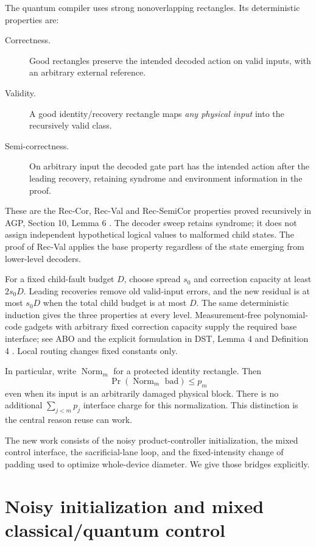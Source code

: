 \documentclass[11pt]{article}
\newcommand{\Norm}{\operatorname{Norm}}
\begin{document}
The quantum compiler uses strong nonoverlapping rectangles. Its
deterministic properties are:
\begin{description}
\item[Correctness.] Good rectangles preserve the intended decoded action
on valid inputs, with an arbitrary external reference.
\item[Validity.] A good identity/recovery rectangle maps \emph{any physical
input} into the recursively valid class.
\item[Semi-correctness.] On arbitrary input the decoded gate part has the
intended action after the leading recovery, retaining syndrome and
environment information in the proof.
\end{description}
These are the Rec-Cor, Rec-Val and Rec-SemiCor properties proved recursively
in AGP, Section 10, Lemma 6 \cite{AGP}. The decoder sweep retains syndrome;
it does not assign independent hypothetical logical values to malformed
child states. The proof of Rec-Val applies the base property regardless
of the state emerging from lower-level decoders.

For a fixed child-fault budget $D$, choose spread $s_0$ and correction
capacity at least $2s_0D$. Leading recoveries remove old valid-input errors,
and the new residual is at most $s_0D$ when the total child budget is at
most $D$. The same deterministic induction gives the three properties at
every level. Measurement-free polynomial-code gadgets with arbitrary
fixed correction capacity supply the required base interface; see
ABO \cite{ABO} and the explicit formulation in DST, Lemma 4 and
Definition 4 \cite{DST}. Local routing changes fixed constants only.

In particular, write $\Norm_m$ for a protected identity rectangle. Then
\[
 \Pr(\Norm_m\text{ bad})\leq p_m
\]
even when its input is an arbitrarily damaged physical block. There is
no additional $\sum_{j<m}p_j$ interface charge for this normalization.
This distinction is the central reason reuse can work.

The new work consists of the noisy product-controller initialization,
the mixed control interface, the sacrificial-lane loop, and the
fixed-intensity change of padding used to optimize whole-device diameter.
We give those bridges explicitly.

\section{Noisy initialization and mixed classical/quantum control}
\end{document}

